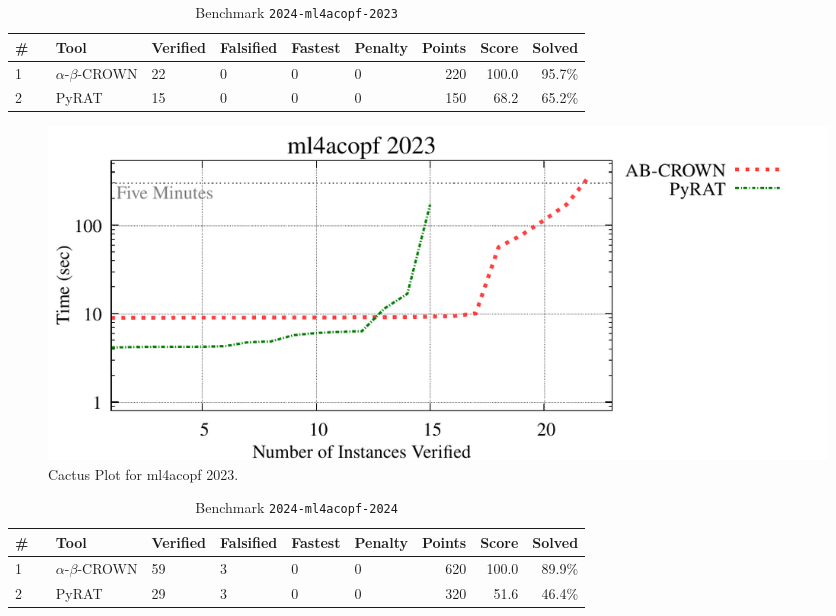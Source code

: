 \clearpage

\begin{table}[h]
\begin{center}
\caption{Benchmark \texttt{2024-ml4acopf-2023}} \label{tab:cat_{cat}}
{\setlength{\tabcolsep}{2pt}
\begin{tabular}[h]{@{}llllllrrr@{}}
\toprule
\textbf{\# ~} & \textbf{Tool} & \textbf{Verified} & \textbf{Falsified} & \textbf{Fastest} & \textbf{Penalty} & \textbf{Points} & \textbf{Score} & \textbf{Solved}\\
\midrule
1 & $\alpha$-$\beta$-CROWN & 22 & 0 & 0 & 0 & 220 & 100.0 & 95.7\% \\
2 & PyRAT & 15 & 0 & 0 & 0 & 150 & 68.2 & 65.2\% \\
\bottomrule
\end{tabular}
}
\end{center}
\end{table}



\begin{figure}[h]
\centerline{\includegraphics[width=\textwidth]{cactus/2024_ml4acopf_2023.pdf}}
\caption{Cactus Plot for ml4acopf 2023.}
\label{fig:quantPic}
\end{figure}


\clearpage

\begin{table}[h]
\begin{center}
\caption{Benchmark \texttt{2024-ml4acopf-2024}} \label{tab:cat_{cat}}
{\setlength{\tabcolsep}{2pt}
\begin{tabular}[h]{@{}llllllrrr@{}}
\toprule
\textbf{\# ~} & \textbf{Tool} & \textbf{Verified} & \textbf{Falsified} & \textbf{Fastest} & \textbf{Penalty} & \textbf{Points} & \textbf{Score} & \textbf{Solved}\\
\midrule
1 & $\alpha$-$\beta$-CROWN & 59 & 3 & 0 & 0 & 620 & 100.0 & 89.9\% \\
2 & PyRAT & 29 & 3 & 0 & 0 & 320 & 51.6 & 46.4\% \\
\bottomrule
\end{tabular}
}
\end{center}
\end{table}



